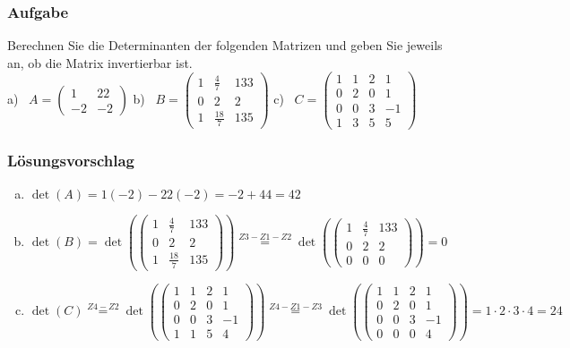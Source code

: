 \documentclass[a4paper,11pt]{scrartcl}
\newcounter{auf}
\newcommand{\Aufgabe}%
        {\addtocounter{auf}{1} \subsubsection*{\rmfamily  Aufgabe \theauf \hspace{1em}} }
\begin{document}
\newpage
\Aufgabe
Berechnen Sie die Determinanten der folgenden Matrizen und geben Sie jeweils an, ob die Matrix invertierbar ist.\\
%
\hspace*{10mm} a) \ $A=\begin{pmatrix} 1 & 22 \\ -2 & -2 \end{pmatrix}$ \qquad
b) \ $B=\begin{pmatrix} 1 & \frac{4}{7} & 133 \\ 0 & 2 & 2 \\1 & \frac{18}{7} & 135 \end{pmatrix}$ \qquad
c) \ $C=\begin{pmatrix} 1 & 1 &  2 & 1 \\ 0 & 2 & 0 & 1 \\ 0 & 0& 3 & -1 \\ 1 & 3 & 5 & 5 \end{pmatrix}$
%
%
\subsubsection*{Lösungsvorschlag}
\begin{enumerate}[a)]
\item $\det(A)=1(-2)-22(-2)=-2+44=42$
\item $\det(B)=\det(\begin{pmatrix} 1 & \frac{4}{7} & 133 \\ 0 & 2 & 2 \\1 & \frac{18}{7} & 135 \end{pmatrix})\stackrel{Z3-Z1-Z2}{=}\det(\begin{pmatrix} 1 & \frac{4}{7} & 133 \\ 0 & 2 & 2 \\0&0&0 \end{pmatrix})=0$
\item $\det(C)\stackrel{Z4-Z2}{=}\det(\begin{pmatrix} 1 & 1 &  2 & 1 \\ 0 & 2 & 0 & 1 \\ 0 & 0& 3 & -1 \\ 1 & 1 & 5 & 4 \end{pmatrix})\stackrel{Z4-Z1-Z3}{=}\det(\begin{pmatrix} 1 & 1 &  2 & 1 \\ 0 & 2 & 0 & 1 \\ 0 & 0& 3 & -1 \\ 0 & 0 & 0 & 4 \end{pmatrix})=1\cdot2\cdot3\cdot4=24$
\end{enumerate}
\end{document}
